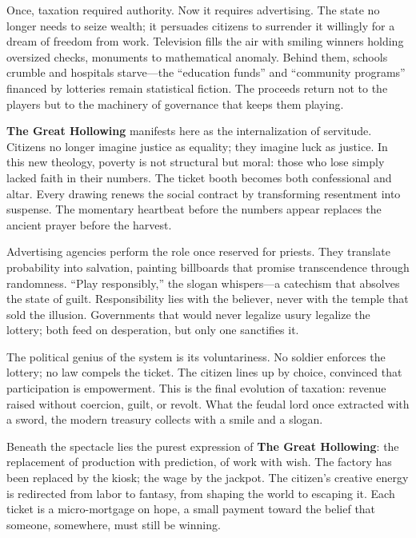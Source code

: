 \documentclass[11pt,twoside]{book}
\begin{document}
Once, taxation required authority.  
Now it requires advertising.  
The state no longer needs to seize wealth; it persuades citizens to surrender it willingly for a dream of freedom from work.  
Television fills the air with smiling winners holding oversized checks, monuments to mathematical anomaly.  
Behind them, schools crumble and hospitals starve—the “education funds” and “community programs” financed by lotteries remain statistical fiction.  
The proceeds return not to the players but to the machinery of governance that keeps them playing.

\textbf{The Great Hollowing} manifests here as the internalization of servitude.  
Citizens no longer imagine justice as equality; they imagine luck as justice.  
In this new theology, poverty is not structural but moral: those who lose simply lacked faith in their numbers.  
The ticket booth becomes both confessional and altar.  
Every drawing renews the social contract by transforming resentment into suspense.  
The momentary heartbeat before the numbers appear replaces the ancient prayer before the harvest.

Advertising agencies perform the role once reserved for priests.  
They translate probability into salvation, painting billboards that promise transcendence through randomness.  
“Play responsibly,” the slogan whispers—a catechism that absolves the state of guilt.  
Responsibility lies with the believer, never with the temple that sold the illusion.  
Governments that would never legalize usury legalize the lottery; both feed on desperation, but only one sanctifies it.

The political genius of the system is its voluntariness.  
No soldier enforces the lottery; no law compels the ticket.  
The citizen lines up by choice, convinced that participation is empowerment.  
This is the final evolution of taxation: revenue raised without coercion, guilt, or revolt.  
What the feudal lord once extracted with a sword, the modern treasury collects with a smile and a slogan.

Beneath the spectacle lies the purest expression of \textbf{The Great Hollowing}:  
the replacement of production with prediction, of work with wish.  
The factory has been replaced by the kiosk; the wage by the jackpot.  
The citizen’s creative energy is redirected from labor to fantasy, from shaping the world to escaping it.  
Each ticket is a micro-mortgage on hope, a small payment toward the belief that someone, somewhere, must still be winning.
\end{document}
